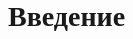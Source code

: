 
\usepackage{setspace}



\def\labauthors{Понур К.А., Сарафанов Ф.Г., Сидоров Д.А.}
\def\labgroup{420}
\def\labnumber{000}
\def\labtheme{Изучение явлений двулучепреломления и поляризации света на приборе Норренберга}
\renewcommand{\vec}{\mathbf}
\renewcommand{\Re}{\operatorname{Re}}
\renewcommand{\Im}{\operatorname{Im}}
\renewcommand{\phi}{\varphi}
\renewcommand{\kappa}{\varkappa}
\renewcommand{\hat}{\widehat}

\begin{spacing}{1}
\tableofcontents
\end{spacing}
\newpage
 
\section{Введение}
